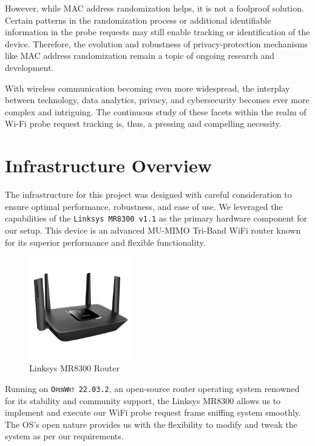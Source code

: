 \documentclass{article}
\begin{document}
However, while MAC address randomization helps, it is not a foolproof solution. Certain patterns in the randomization process or additional identifiable information in the probe requests may still enable tracking or identification of the device. Therefore, the evolution and robustness of privacy-protection mechanisms like MAC address randomization remain a topic of ongoing research and development. 

With wireless communication becoming even more widespread, the interplay between technology, data analytics, privacy, and cybersecurity becomes ever more complex and intriguing. The continuous study of these facets within the realm of Wi-Fi probe request tracking is, thus, a pressing and compelling necessity.


\section{Infrastructure Overview}

The infrastructure for this project was designed with careful consideration to ensure optimal performance, robustness, and ease of use. We leveraged the capabilities of the \texttt{Linksys MR8300 v1.1} as the primary hardware component for our setup. This device is an advanced MU-MIMO Tri-Band WiFi router known for its superior performance and flexible functionality.

\begin{figure}[h]
    \centering
    \includegraphics[width=0.4\textwidth]{assets/linksys_mr800.png}
    \caption{Linksys MR8300 Router}
    \label{fig:router}
\end{figure}

Running on \texttt{\textsc{OpenWrt} 22.03.2}, an open-source router operating system renowned for its stability and community support, the Linksys MR8300 allows us to implement and execute our WiFi probe request frame sniffing system smoothly. The OS's open nature provides us with the flexibility to modify and tweak the system as per our requirements.
\end{document}
